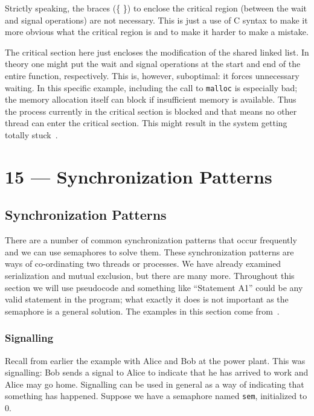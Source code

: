 \documentclass[a4paper]{report}
\begin{document}
Strictly speaking, the braces (\{ \}) to enclose the critical region (between the wait and signal operations) are not necessary. This is just a use of C syntax to make it more obvious what the critical region is and to make it harder to make a mistake.

The critical section here just encloses the modification of the shared linked list. In theory one might put the wait and signal operations at the start and end of the entire function, respectively. This is, however, suboptimal: it forces unnecessary waiting. In this specific example, including the call to \texttt{malloc} is especially bad; the memory allocation itself can block if insufficient memory is available. Thus the process currently in the critical section is blocked and that means no other thread can enter the critical section. This might result in the system getting totally stuck~\cite{mte241}.










\chapter*{15 --- Synchronization Patterns}


\section*{Synchronization Patterns}

There are a number of common synchronization patterns that occur frequently and we can use semaphores to solve them. These synchronization patterns are ways of co-ordinating two threads or processes. We have already examined serialization and mutual exclusion, but there are many more. Throughout this section we will use pseudocode and something like ``Statement A1'' could be any valid statement in the program; what exactly it does is not important as the semaphore is a general solution. The examples in this section come from~\cite{lbs}.

\subsection*{Signalling}
Recall from earlier the example with Alice and Bob at the power plant. This was signalling: Bob sends a signal to Alice to indicate that he has arrived to work and Alice may go home. Signalling can be used in general as a way of indicating that something has happened. Suppose we have a semaphore named \texttt{sem}, initialized to 0.
\end{document}
